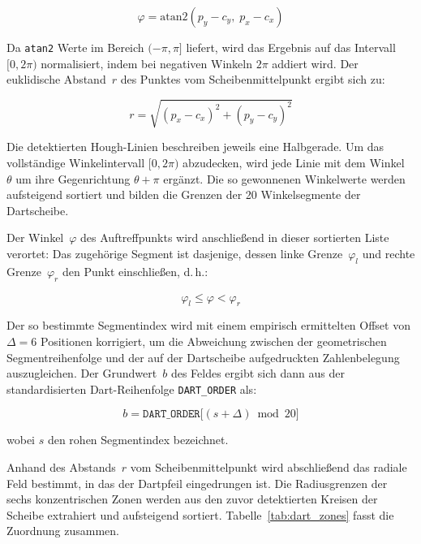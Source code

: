 \begin{equation}
    \varphi = \mathrm{atan2}(p_y - c_y,\; p_x - c_x)
\end{equation}

Da \texttt{atan2} Werte im Bereich $(-\pi, \pi]$ liefert, wird das Ergebnis auf das Intervall $[0, 2\pi)$ normalisiert, indem bei negativen Winkeln $2\pi$ addiert wird. Der euklidische Abstand~$r$ des Punktes vom Scheibenmittelpunkt ergibt sich zu:
 
\begin{equation}
    r = \sqrt{(p_x - c_x)^2 + (p_y - c_y)^2}
\end{equation}

Die detektierten Hough-Linien beschreiben jeweils eine Halbgerade. Um das
vollständige Winkelintervall $[0, 2\pi)$ abzudecken, wird jede Linie mit dem
Winkel~$\theta$ um ihre Gegenrichtung $\theta + \pi$ ergänzt. Die so gewonnenen
Winkelwerte werden aufsteigend sortiert und bilden die Grenzen der 20 Winkelsegmente
der Dartscheibe.

Der Winkel~$\varphi$ des Auftreffpunkts wird anschließend in dieser sortierten Liste
verortet: Das zugehörige Segment ist dasjenige, dessen linke Grenze~$\varphi_l$ und
rechte Grenze~$\varphi_r$ den Punkt einschließen, d.\,h.:

\begin{equation}
    \varphi_l \leq \varphi < \varphi_r
\end{equation}

Der so bestimmte Segmentindex wird mit einem empirisch ermittelten Offset von
$\Delta = 6$ Positionen korrigiert, um die Abweichung zwischen der geometrischen
Segmentreihenfolge und der auf der Dartscheibe aufgedruckten Zahlenbelegung
auszugleichen. Der Grundwert~$b$ des Feldes ergibt sich dann aus der
standardisierten Dart-Reihenfolge \texttt{DART\_ORDER} als:

\begin{equation}
    b = \texttt{DART\_ORDER}\bigl[(s + \Delta) \bmod 20\bigr]
\end{equation}

wobei $s$ den rohen Segmentindex bezeichnet.

Anhand des Abstands~$r$ vom Scheibenmittelpunkt wird abschließend das radiale Feld
bestimmt, in das der Dartpfeil eingedrungen ist. Die Radiusgrenzen der sechs
konzentrischen Zonen werden aus den zuvor detektierten Kreisen der Scheibe
extrahiert und aufsteigend sortiert. Tabelle~\ref{tab:dart_zones} fasst die
Zuordnung zusammen.

